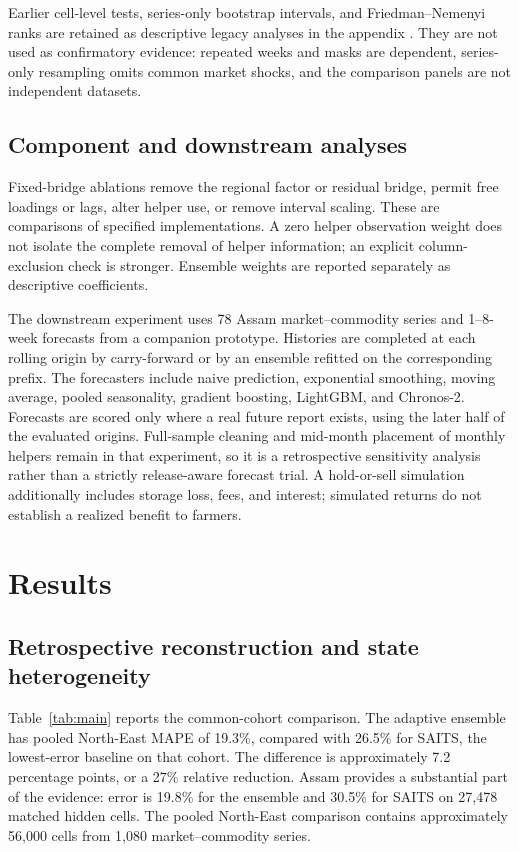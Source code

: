 \documentclass[sigconf,nonacm,balance=false]{acmart}
\begin{document}
Earlier cell-level tests, series-only bootstrap intervals, and Friedman--Nemenyi ranks are retained as descriptive legacy analyses in the appendix \cite{demsar2006}. They are not used as confirmatory evidence: repeated weeks and masks are dependent, series-only resampling omits common market shocks, and the comparison panels are not independent datasets.

\subsection{Component and downstream analyses}

Fixed-bridge ablations remove the regional factor or residual bridge, permit free loadings or lags, alter helper use, or remove interval scaling. These are comparisons of specified implementations. A zero helper observation weight does not isolate the complete removal of helper information; an explicit column-exclusion check is stronger. Ensemble weights are reported separately as descriptive coefficients.

The downstream experiment uses 78 Assam market--commodity series and 1--8-week forecasts from a companion prototype. Histories are completed at each rolling origin by carry-forward or by an ensemble refitted on the corresponding prefix. The forecasters include naive prediction, exponential smoothing, moving average, pooled seasonality, gradient boosting, LightGBM, and Chronos-2. Forecasts are scored only where a real future report exists, using the later half of the evaluated origins. Full-sample cleaning and mid-month placement of monthly helpers remain in that experiment, so it is a retrospective sensitivity analysis rather than a strictly release-aware forecast trial. A hold-or-sell simulation additionally includes storage loss, fees, and interest; simulated returns do not establish a realized benefit to farmers.

\section{Results}\label{sec:results}

\subsection{Retrospective reconstruction and state heterogeneity}

Table~\ref{tab:main} reports the common-cohort comparison. The adaptive ensemble has pooled North-East MAPE of 19.3\%, compared with 26.5\% for SAITS, the lowest-error baseline on that cohort. The difference is approximately 7.2 percentage points, or a 27\% relative reduction. Assam provides a substantial part of the evidence: error is 19.8\% for the ensemble and 30.5\% for SAITS on 27,478 matched hidden cells. The pooled North-East comparison contains approximately 56,000 cells from 1,080 market--commodity series.
\end{document}
